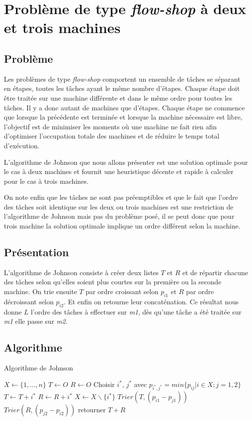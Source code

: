 \section{Problème de type {\em flow-shop} à deux et trois machines}
\subsection{Problème}
Les problèmes de type {\em flow-shop} comportent un ensemble de tâches se
séparant en étapes, toutes les tâches ayant le même nombre d'étapes. Chaque
étape doit être traitée sur une machine différente et dans le même ordre pour
toutes les tâches. Il y a donc autant de machines que d'étapes. Chaque étape ne
commence que lorsque la précédente est terminée et lorsque la machine nécessaire
est libre, l'objectif est de minimiser les moments où une machine ne fait rien
afin d'optimiser l'occupation totale des machines et de réduire le temps total
d'exécution.

L'algorithme de Johnson que nous allons présenter est une solution optimale pour
le cas à deux machines et fournit une heuristique décente et rapide à calculer
pour le cas à trois machines.

On note enfin que les tâches ne sont pas préemptibles et que le fait que l'ordre
des tâches soit identique sur les deux ou trois machines est une restriction de
l'algorithme de Johnson mais pas du problème posé, il se peut donc que pour
trois machine la solution optimale implique un ordre différent selon la
machine.

\subsection{Présentation}
L'algorithme de Johnson consiste à créer deux listes $T$ et $R$ et de répartir
chacune des tâches selon qu'elles soient plus courtes sur la première ou la
seconde machine. On trie ensuite $T$ par ordre croissant selon $p_{i1}$ et $R$ par
ordre décroissant selon $p_{i2}$. Et enfin on retourne leur concaténation.
Ce résultat nous donne $L$ l'ordre des tâches à effectuer sur {\em m1},
dès qu'une tâche a été traitée sur {\em m1} elle passe sur {\em m2}.

\subsection{Algorithme}
\begin{algorithm}
\caption{Algorithme de Johnson}
\begin{algorithmic}
\STATE $X \leftarrow \{1,...,n\}$
\STATE $T \leftarrow O$
\STATE $R \leftarrow O$
	\STATE Choisir $i^*$, $j^*$ avec $p_{i^*,j^*} = min\{p_{ij}|i \in X; j = 1,2\}$
		\STATE $T \leftarrow T + i^*$
	\ELSE
		\STATE $R \leftarrow R + i^*$
	\ENDIF
	\STATE $X \leftarrow X\backslash\{i^*\}$
\ENDWHILE
\STATE $Trier(T, (p_{i1} - p_{j1}))$
\STATE $Trier(R, (p_{j2} - p_{i2}))$
\STATE retourner $T + R$
\end{algorithmic}
\end{algorithm}

